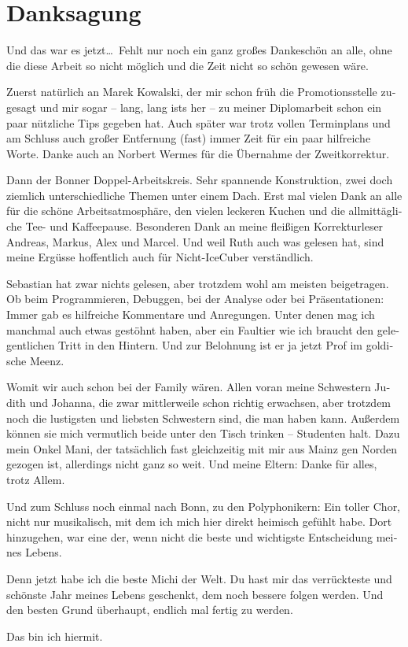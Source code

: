 \chapter*{Danksagung}
\label{sec:ack}

\begin{otherlanguage}{ngerman}
Und das war es jetzt\dots\ Fehlt nur noch ein ganz gro\ss{}es Dankesch\"on an 
alle, ohne die diese Arbeit so nicht m\"oglich und die Zeit nicht so sch\"on 
gewesen w\"are.

Zuerst nat\"urlich an Marek Kowalski, der mir schon fr\"uh die Promotionsstelle 
zugesagt und mir sogar -- lang, lang ists her -- zu meiner Diplomarbeit schon 
ein paar n\"utzliche Tips gegeben hat. Auch sp\"ater war trotz vollen 
Terminplans und am Schluss auch gro\ss{}er Entfernung (fast) immer Zeit f\"ur 
ein paar hilfreiche Worte.
Danke auch an Norbert Wermes f\"ur die \"Ubernahme der Zweitkorrektur.

Dann der Bonner Doppel-Arbeitskreis. Sehr spannende Konstruktion, zwei doch 
ziemlich unterschiedliche Themen unter einem Dach. Erst mal vielen Dank an alle 
f\"ur die sch\"one Arbeitsatmosph\"are, den vielen leckeren Kuchen und die 
allmitt\"agliche Tee- und Kaffeepause. Besonderen Dank an meine flei\ss{}igen 
Korrekturleser Andreas, Markus, Alex und Marcel. Und weil Ruth auch was gelesen 
hat, sind meine Erg\"usse hoffentlich auch f\"ur Nicht-IceCuber verst\"andlich. 

Sebastian hat zwar nichts gelesen, aber trotzdem wohl am meisten beigetragen. 
Ob beim Programmieren, Debuggen, bei der Analyse oder bei Pr\"asentationen: 
Immer gab es hilfreiche Kommentare und Anregungen. Unter denen mag ich manchmal 
auch etwas gest\"ohnt haben, aber ein Faultier wie ich braucht den 
gelegentlichen Tritt in den Hintern. Und zur Belohnung ist er ja jetzt Prof 
im goldische Meenz.

Womit wir auch schon bei der Family w\"aren. Allen voran meine Schwestern 
Judith und Johanna, die zwar mittlerweile schon richtig erwachsen, aber 
trotzdem noch die lustigsten und liebsten Schwestern sind, die man haben kann. 
Au\ss{}erdem k\"onnen sie mich vermutlich beide unter den Tisch trinken -- 
Studenten halt. Dazu mein Onkel Mani, der tats\"achlich fast gleichzeitig mit 
mir aus Mainz gen Norden gezogen ist, allerdings nicht ganz so weit. Und meine 
Eltern: Danke f\"ur alles, trotz Allem.

Und zum Schluss noch einmal nach Bonn, zu den Polyphonikern: Ein toller Chor, 
nicht nur musikalisch, mit dem ich mich hier direkt heimisch gef\"uhlt habe. 
Dort hinzugehen, war eine der, wenn nicht die beste und wichtigste Entscheidung 
meines Lebens. 

Denn jetzt habe ich die beste Michi der Welt. Du hast mir das verr\"uckteste 
und sch\"onste Jahr meines Lebens geschenkt, dem noch bessere folgen werden. 
Und den besten Grund \"uberhaupt, endlich mal fertig zu werden. 

Das bin ich hiermit.


\end{otherlanguage}

